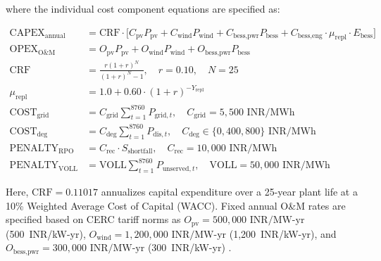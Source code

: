 \documentclass[11pt,a4paper]{article}
\begin{document}
where the individual cost component equations are specified as:

\begin{align}
\text{CAPEX}_{\text{annual}} &= \text{CRF} \cdot \Big[ C_{\text{pv}} P_{\text{pv}} + C_{\text{wind}} P_{\text{wind}} + C_{\text{bess,pwr}} P_{\text{bess}} + C_{\text{bess,eng}} \cdot \mu_{\text{repl}} \cdot E_{\text{bess}} \Big] \label{eq:capex} \\
\text{OPEX}_{\text{O\&M}} &= O_{\text{pv}} P_{\text{pv}} + O_{\text{wind}} P_{\text{wind}} + O_{\text{bess,pwr}} P_{\text{bess}} \label{eq:opex} \\
\text{CRF} &= \frac{r(1+r)^N}{(1+r)^N - 1}, \quad r = 0.10, \quad N = 25 \label{eq:crf} \\
\mu_{\text{repl}} &= 1.0 + 0.60 \cdot (1 + r)^{-Y_{\text{repl}}} \label{eq:repl} \\
\text{COST}_{\text{grid}} &= C_{\text{grid}} \sum_{t=1}^{8760} P_{\text{grid},t}, \quad C_{\text{grid}} = 5,500\text{ INR/MWh} \label{eq:cost_grid} \\
\text{COST}_{\text{deg}} &= C_{\text{deg}} \sum_{t=1}^{8760} P_{\text{dis},t}, \quad C_{\text{deg}} \in \{0, 400, 800\}\text{ INR/MWh} \label{eq:cost_deg} \\
\text{PENALTY}_{\text{RPO}} &= C_{\text{rec}} \cdot S_{\text{shortfall}}, \quad C_{\text{rec}} = 10,000\text{ INR/MWh} \label{eq:penalty_rpo} \\
\text{PENALTY}_{\text{VOLL}} &= \text{VOLL} \sum_{t=1}^{8760} P_{\text{unserved},t}, \quad \text{VOLL} = 50,000\text{ INR/MWh} \label{eq:penalty_voll}
\end{align}

Here, $\text{CRF} = 0.11017$ annualizes capital expenditure over a 25-year plant life at a 10\% Weighted Average Cost of Capital (WACC). Fixed annual O\&M rates are specified based on CERC tariff norms as $O_{\text{pv}} = 500,000\text{ INR/MW-yr}$ (500~INR/kW-yr), $O_{\text{wind}} = 1,200,000\text{ INR/MW-yr}$ (1,200~INR/kW-yr), and $O_{\text{bess,pwr}} = 300,000\text{ INR/MW-yr}$ (300~INR/kW-yr) \cite{CERC2024}.
\end{document}
